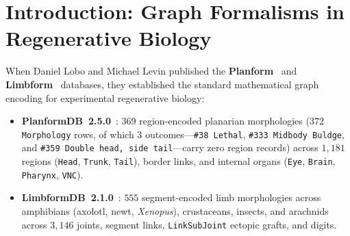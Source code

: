 \documentclass[11pt,a4paper]{article}
\theoremstyle{definition}
\theoremstyle{remark}
\begin{document}
\tableofcontents

\section{Introduction: Graph Formalisms in Regenerative Biology}

When Daniel Lobo and Michael Levin published the \textbf{Planform}~\cite{Lobo2013Planform,Lobo2013BiologyOpen} and \textbf{Limbform}~\cite{Lobo2014Limbform,Lobo2014Regeneration} databases, they established the standard mathematical graph encoding for experimental regenerative biology:
\begin{itemize}
  \item \textbf{PlanformDB~2.5.0}~\cite{Lobo2013Planform,Lobo2013BiologyOpen}: $369$ region-encoded planarian morphologies ($372$ \texttt{Morphology} rows, of which $3$ outcomes---\texttt{\#38 Lethal}, \texttt{\#333 Midbody Buldge}, and \texttt{\#359 Double head, side tail}---carry zero region records) across $1{,}181$ regions (\texttt{Head}, \texttt{Trunk}, \texttt{Tail}), border links, and internal organs (\texttt{Eye}, \texttt{Brain}, \texttt{Pharynx}, \texttt{VNC}).
  \item \textbf{LimbformDB~2.1.0}~\cite{Lobo2014Limbform,Lobo2014Regeneration}: $555$ segment-encoded limb morphologies across amphibians (axolotl, newt, \emph{Xenopus}), crustaceans, insects, and arachnids across $3{,}146$ joints, segment links, \texttt{LinkSubJoint} ectopic grafts, and digits.
\end{itemize}
\end{document}
